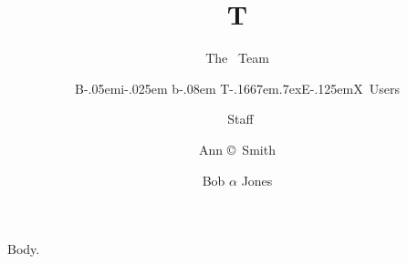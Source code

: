 \documentclass{article}
\def\BibTeX{{\rm B\kern-.05em{\sc i\kern-.025em b}\kern-.08em T\kern-.1667em\lower.7ex\hbox{E}\kern-.125emX}}
\begin{document}
\title{T}
\author{The \LaTeXe\ Team \and \BibTeX\ Users \and \AmS\ Staff \and Ann \copyright\ Smith \and Bob \ensuremath{\alpha} Jones}
\maketitle
Body.
\end{document}
